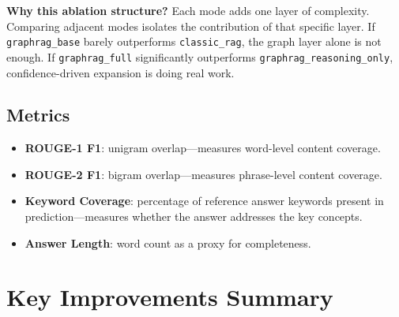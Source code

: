 \documentclass[11pt]{article}
\begin{document}
\textbf{Why this ablation structure?} Each mode adds one layer of complexity. Comparing adjacent modes isolates the contribution of that specific layer. If \texttt{graphrag\_base} barely outperforms \texttt{classic\_rag}, the graph layer alone is not enough. If \texttt{graphrag\_full} significantly outperforms \texttt{graphrag\_reasoning\_only}, confidence-driven expansion is doing real work.

\subsection{Metrics}

\begin{itemize}[leftmargin=1.2em]
  \item \textbf{ROUGE-1 F1}: unigram overlap---measures word-level content coverage.
  \item \textbf{ROUGE-2 F1}: bigram overlap---measures phrase-level content coverage.
  \item \textbf{Keyword Coverage}: percentage of reference answer keywords present in prediction---measures whether the answer addresses the key concepts.
  \item \textbf{Answer Length}: word count as a proxy for completeness.
\end{itemize}

\section{Key Improvements Summary}
\end{document}
